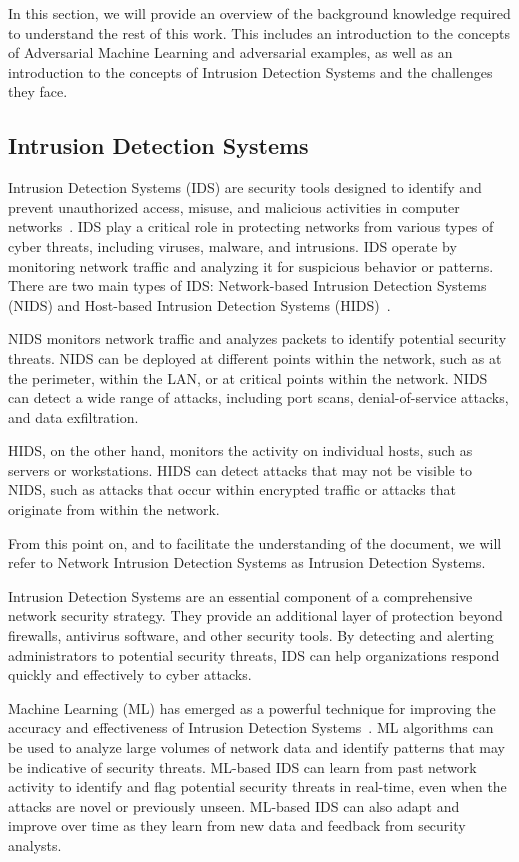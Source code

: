 In this section, we will provide an overview of the background knowledge required to understand the rest of this work.
This includes an introduction to the concepts of Adversarial Machine Learning and adversarial examples, as well as an
introduction to the concepts of Intrusion Detection Systems and the challenges they face.

\subsection{Intrusion Detection Systems}\label{subsec:intrusion-detection-systems}
Intrusion Detection Systems (IDS) are security tools designed to identify and prevent unauthorized access, misuse, and
malicious activities in computer networks~\cite{mukherjee1994network}.
IDS play a critical role in protecting networks from various types of cyber threats, including viruses, malware, and
intrusions.
IDS operate by monitoring network traffic and analyzing it for suspicious behavior or patterns.
There are two main types of IDS: Network-based Intrusion Detection Systems (NIDS) and Host-based Intrusion Detection
Systems (HIDS)~\cite{pharate2015classification}.

NIDS monitors network traffic and analyzes packets to identify potential security threats.
NIDS can be deployed at different points within the network, such as at the perimeter, within the LAN, or at critical
points within the network.
NIDS can detect a wide range of attacks, including port scans, denial-of-service attacks, and data exfiltration.

HIDS, on the other hand, monitors the activity on individual hosts, such as servers or workstations.
HIDS can detect attacks that may not be visible to NIDS, such as attacks that occur within encrypted traffic or attacks
that originate from within the network.

From this point on, and to facilitate the understanding of the document, we will refer to Network Intrusion Detection
Systems as Intrusion Detection Systems.

Intrusion Detection Systems are an essential component of a comprehensive network security strategy.
They provide an additional layer of protection beyond firewalls, antivirus software, and other security tools.
By detecting and alerting administrators to potential security threats, IDS can help organizations respond quickly and
effectively to cyber attacks.

Machine Learning (ML) has emerged as a powerful technique for improving the accuracy and effectiveness of Intrusion
Detection Systems~\cite{abdallah2022intrusion, maseer2021benchmarking, thakkar2020review}.
ML algorithms can be used to analyze large volumes of network data and identify patterns that may be indicative of
security threats.
ML-based IDS can learn from past network activity to identify and flag potential security threats in real-time, even
when the attacks are novel or previously unseen.
ML-based IDS can also adapt and improve over time as they learn from new data and feedback from security analysts.

